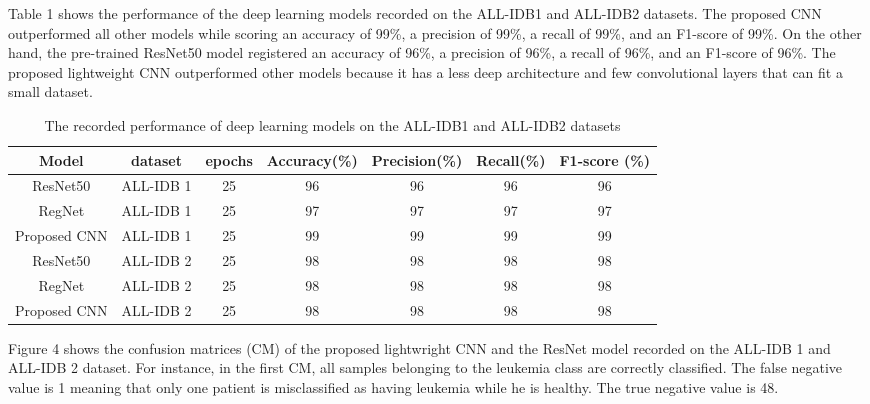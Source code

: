 \documentclass[diagnostics,article,submit,pdftex,moreauthors]{Definitions/mdpi}
\begin{document}
Table 1 shows the performance of the deep learning models recorded on the ALL-IDB1 and ALL-IDB2 datasets. The proposed CNN outperformed all other models while scoring an accuracy of 99\%, a precision of 99\%, a recall of 99\%, and an F1-score of 99\%.  On the other hand, the pre-trained ResNet50 model registered an accuracy of 96\%, a precision of 96\%, a recall of 96\%, and an F1-score of 96\%. The proposed lightweight CNN outperformed other models because it has a less deep architecture and few convolutional layers that can fit a small dataset.

\begin{table}[h!]
  \centering
  \caption{The recorded performance of deep learning models on the ALL-IDB1 and ALL-IDB2 datasets}
  \begin{adjustbox}{width=\columnwidth,center}
    \begin{tabular}{c c c  c  c  c c}
      \hline
      Model & dataset & epochs & Accuracy(\%) & Precision(\%) & Recall(\%) & F1-score (\%)\\ [0.5ex]
      \hline
      ResNet50 & ALL-IDB 1 & 25 & 96 & 96 & 96 & 96\\
      RegNet & ALL-IDB 1 & 25 & 97 & 97 & 97 & 97 \\
      Proposed CNN & ALL-IDB 1 & 25 & 99 & 99 & 99 & 99 \\
      ResNet50 & ALL-IDB 2 & 25 & 98 & 98 & 98 & 98\\
      RegNet & ALL-IDB 2 & 25 & 98 & 98 & 98 & 98 \\
      Proposed CNN & ALL-IDB 2 & 25 & 98 & 98 & 98 & 98 \\
      \hline
    \end{tabular}
  \end{adjustbox}
  \label{table:1}
\end{table}



Figure 4 shows the confusion matrices (CM) of the proposed lightwright CNN and the ResNet model recorded on the ALL-IDB 1 and ALL-IDB 2 dataset. For instance, in the first CM, all samples belonging to the leukemia class are correctly classified. The false negative value is 1 meaning that only one patient is misclassified as having leukemia while he is healthy.  The true negative value is 48.
\end{document}
